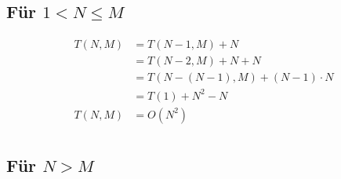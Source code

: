 \documentclass[parskip=half,a4paper]{scrartcl}
\begin{document}
\subsection*{Für $1 < N \le M$}


\begin{equation}
\begin{aligned}
    T\left(N, M\right) & =  T\left(N-1, M\right) + N\\
& = T\left(N-2, M\right) + N + N\\
& = T\left(N-\left(N-1\right), M\right) + \left(N-1\right) \cdot N\\
& = T\left(1\right) + N^2 - N\\
T(N,M) & = O(N^2)\\
\end{aligned}
\end{equation}

\subsection*{Für $N > M$}
\end{document}
